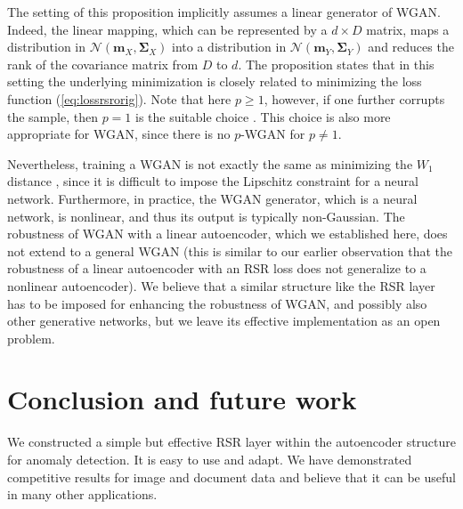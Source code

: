 \documentclass{article} \usepackage{iclr2020_conference,times}
\def\eqref#1{(\ref{#1})}
\def\rvm{{\mathbf{m}}}
\def\rmSigma{{\mathbf{\Sigma}}}
\begin{document}
The setting of this proposition implicitly assumes a linear generator of WGAN. Indeed, the linear mapping, which can be represented by a $d \times D$ matrix, maps a distribution in $\mathcal{N} (\rvm_X, \rmSigma_X)$ into a distribution in 
$\mathcal{N}(\rvm_Y, \rmSigma_Y)$ and reduces the rank of the covariance matrix from $D$ to $d$. The proposition states that in this setting the underlying minimization is closely related to minimizing the loss function \eqref{eq:lossrsrorig}. Note that here $p \geq 1$, however, if one further corrupts the sample, then $p=1$ is the suitable choice \citep{lerman2018overview}. This choice is also more appropriate for WGAN, since there is no $p$-WGAN for $p \neq 1$. 

Nevertheless, training a WGAN is not exactly the same as minimizing the $W_1$ distance \citep{gulrajani2017improved}, since it is difficult to impose the Lipschitz constraint for a neural network. 
Furthermore, in practice, the WGAN generator, which is a neural network, is nonlinear, and thus its output is typically non-Gaussian.
The robustness of WGAN with a linear autoencoder, which we established here, does not extend to a general WGAN (this is similar to our earlier observation that the robustness of a linear autoencoder with an RSR loss does not generalize to a nonlinear autoencoder). We believe that a similar structure like the RSR layer has to be imposed for enhancing the robustness of WGAN, and possibly also other generative networks, but we leave its effective implementation as an open problem.















 
 
 
\section{Conclusion and future work} 
\label{sec:conclude}
We constructed a simple but effective RSR layer within the autoencoder structure for anomaly detection. It is easy to use and adapt. 
We have demonstrated competitive results for image and document data and believe that it can be useful in many other applications.
\end{document}
